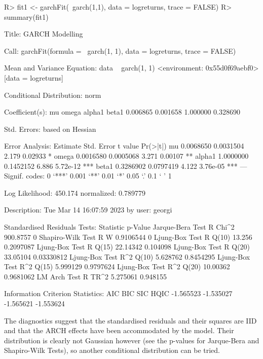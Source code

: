\documentclass[article,nojss]{jss}
\begin{document}
\begin{Schunk}
\begin{Sinput}
R> fit1 <- garchFit(~garch(1,1), data = logreturns, trace = FALSE)
R> summary(fit1)
\end{Sinput}
\begin{Soutput}
Title:
 GARCH Modelling 

Call:
 garchFit(formula = ~garch(1, 1), data = logreturns, trace = FALSE) 

Mean and Variance Equation:
 data ~ garch(1, 1)
<environment: 0x55d0f69aebf0>
 [data = logreturns]

Conditional Distribution:
 norm 

Coefficient(s):
      mu     omega    alpha1     beta1  
0.006865  0.001658  1.000000  0.328690  

Std. Errors:
 based on Hessian 

Error Analysis:
        Estimate  Std. Error  t value Pr(>|t|)    
mu     0.0068650   0.0031504    2.179  0.02933 *  
omega  0.0016580   0.0005068    3.271  0.00107 ** 
alpha1 1.0000000   0.1452152    6.886 5.72e-12 ***
beta1  0.3286902   0.0797419    4.122 3.76e-05 ***
---
Signif. codes:  0 ‘***’ 0.001 ‘**’ 0.01 ‘*’ 0.05 ‘.’ 0.1 ‘ ’ 1

Log Likelihood:
 450.174    normalized:  0.789779 

Description:
 Tue Mar 14 16:07:59 2023 by user: georgi 


Standardised Residuals Tests:
                                Statistic p-Value   
 Jarque-Bera Test   R    Chi^2  900.8757  0         
 Shapiro-Wilk Test  R    W      0.9106544 0         
 Ljung-Box Test     R    Q(10)  13.256    0.2097087 
 Ljung-Box Test     R    Q(15)  22.14342  0.104098  
 Ljung-Box Test     R    Q(20)  33.05104  0.03330812
 Ljung-Box Test     R^2  Q(10)  5.628762  0.8454295 
 Ljung-Box Test     R^2  Q(15)  5.999129  0.9797624 
 Ljung-Box Test     R^2  Q(20)  10.00362  0.9681062 
 LM Arch Test       R    TR^2   5.275061  0.948155  

Information Criterion Statistics:
      AIC       BIC       SIC      HQIC 
-1.565523 -1.535027 -1.565621 -1.553624 
\end{Soutput}
\end{Schunk}

The diagnostics suggest that the standardised residuals and their squares are IID and that
the ARCH effects have been accommodated by the model. Their distribution is clearly not
Gaussian however (see the p-values for Jarque-Bera and Shapiro-Wilk Tests), so another conditional
distribution can be tried.
\end{document}
